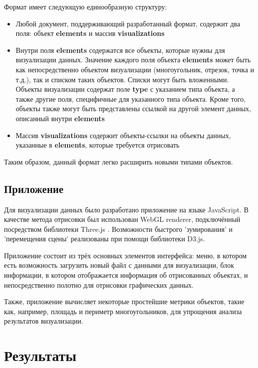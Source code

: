 \documentclass[12pt]{article}
\begin{document}
Формат имеет следующую единообразную структуру: 
\begin{itemize}
	\item Любой документ, поддерживающий разработанный формат, содержит два поля: объект \textbf{elements} и массив \textbf{visualizations}
	\item Внутри поля \textbf{elements} содержатся все объекты, которые нужны для визуализации данных. Значение каждого поля объекта \textbf{elements}  может быть как  непосредственно  объектом визуализации (многоугольник, отрезок, точка и т.д.), так и списком таких объектов. Списки могут быть вложенными. Объекты визуализации содержат поле \textbf{type} с указанием типа объекта, а также другие поля, специфичные для указанного типа объекта. Кроме того, объекты также могут быть представлены ссылкой на другой элемент данных, описанный внутри \textbf{elements}
	\item Массив \textbf{visualizations} содержит объекты-ссылки на объекты данных, указанные в \textbf{elements}, которые требуется отрисовать
\end{itemize}

Таким образом, данный формат легко расширить новыми типами объектов.

\subsection{Приложение}

Для визуализации данных было разработано приложение на языке JavaScript. В качестве метода отрисовки был использован WebGL renderer, подключённый посредством библиотеки Three.js \cite{b5}. Возможности быстрого 'зумирования' и 'перемещения сцены' реализованы при помощи библиотеки D3.js\cite{b6}. 

Приложение состоит из трёх основных элементов интерфейса: меню, в котором есть возможность загрузить новый файл с данными для визуализации, блок информации, в котором отображается информация об отрисованных объектах, и непосредственно полотно для отрисовки графических данных. 

Также, приложение вычисляет некоторые простейшие метрики объектов, такие как, например, площадь и периметр многоугольников, для упрощения анализа результатов визуализации.

\pagebreak

\section{Результаты}
\end{document}
